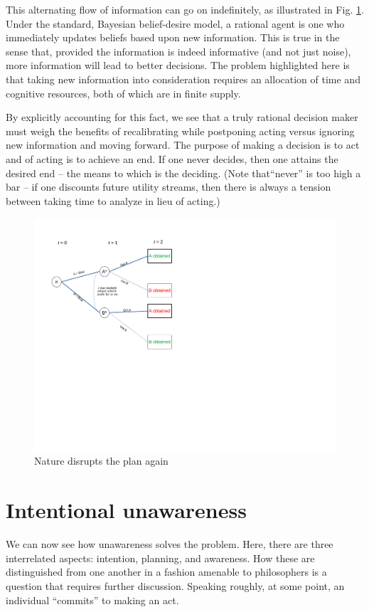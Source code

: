 \documentclass[
11pt,
titlepage,
reqno,
]{article}%
\theoremstyle{definition}
\begin{document}
This alternating flow of information can go on indefinitely, as illustrated in Fig. \ref{Diag: p-10}. Under the standard, Bayesian belief-desire model, a rational agent is one who immediately updates beliefs based upon new information. This is true in the sense that, provided the information is indeed informative (and not just noise), more information will lead to better decisions. The problem highlighted here is that taking new information into consideration requires an allocation of time and cognitive resources, both of which are in finite supply. 

By explicitly accounting for this fact, we see that a truly rational decision maker must weigh the benefits of recalibrating while postponing acting versus ignoring new information and moving forward. The purpose of making a decision is to act and of acting is to achieve an end. If one never decides, then one attains the desired end -- the means to which is the deciding. (Note that``never'' is too high a bar -- if one discounts future utility streams, then there is always a tension between taking time to analyze in lieu of acting.)

\begin{figure}[h!]
	\centering
	\includegraphics*[page=10,trim = 0 3.5in 0in 0in,scale=.65]{Awareness_Diagrams_All}
	\caption{Nature disrupts the plan again\label{Diag: p-10}}%
\end{figure}

\section*{Intentional unawareness}
We can now see how unawareness solves the problem. Here, there are three interrelated aspects: intention, planning, and awareness. How these are distinguished from one another in  a fashion amenable to philosophers is a question that requires further discussion. Speaking roughly, at some point, an individual ``commits'' to making an act.
\end{document}
